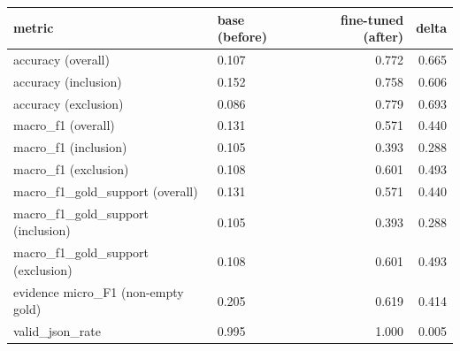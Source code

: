 \begin{tabular}{llrr}
\toprule
metric & base (before) & fine-tuned (after) & delta \\
\midrule
accuracy (overall) & 0.107 & 0.772 & 0.665 \\
accuracy (inclusion) & 0.152 & 0.758 & 0.606 \\
accuracy (exclusion) & 0.086 & 0.779 & 0.693 \\
macro\_f1 (overall) & 0.131 & 0.571 & 0.440 \\
macro\_f1 (inclusion) & 0.105 & 0.393 & 0.288 \\
macro\_f1 (exclusion) & 0.108 & 0.601 & 0.493 \\
macro\_f1\_gold\_support (overall) & 0.131 & 0.571 & 0.440 \\
macro\_f1\_gold\_support (inclusion) & 0.105 & 0.393 & 0.288 \\
macro\_f1\_gold\_support (exclusion) & 0.108 & 0.601 & 0.493 \\
evidence micro\_F1 (non-empty gold) & 0.205 & 0.619 & 0.414 \\
valid\_json\_rate & 0.995 & 1.000 & 0.005 \\
\bottomrule
\end{tabular}
